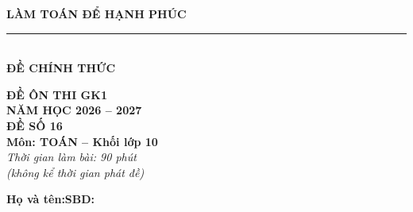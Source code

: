\documentclass[12pt,a4paper]{article}
\begin{document}
\noindent
\begin{minipage}[c]{0.38\textwidth}
    \centering
    \textbf{LÀM TOÁN ĐỂ HẠNH PHÚC}\\[-2pt]
    \rule{3.2cm}{0.6pt}\\[2pt]
    \textbf{ĐỀ CHÍNH THỨC}
\end{minipage}\hfill
\begin{minipage}[c]{0.35\textwidth}
    \centering
    \textbf{ĐỀ ÔN THI GK1}\\
    \textbf{NĂM HỌC 2026 -- 2027}\\[1pt]
    \textbf{ĐỀ SỐ 16}\\
    \textbf{Môn: TOÁN -- Khối lớp 10}\\
    \textit{\small Thời gian làm bài: 90 phút\\(không kể thời gian phát đề)}
\end{minipage}

\vspace{0.1cm}
\noindent
\begin{minipage}[b]{0.78\textwidth}
    \textbf{Họ và tên:}\dotfill\textbf{SBD:}\makebox[3.5cm]{\dotfill}
\end{minipage}\hfill
\begin{minipage}[b]{0.20\textwidth}
    \hfill
    \setlength{\fboxrule}{0.8pt}%
\end{minipage}
\vspace{0.1cm}
\end{document}
